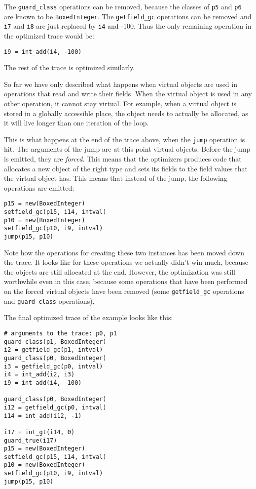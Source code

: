 \documentclass{sigplanconf}
\begin{document}
The \texttt{guard\_class} operations can be removed, because the classes of \texttt{p5} and
\texttt{p6} are known to be \texttt{BoxedInteger}. The \texttt{getfield\_gc} operations can be removed
and \texttt{i7} and \texttt{i8} are just replaced by \texttt{i4} and -100. Thus the only
remaining operation in the optimized trace would be:

\begin{verbatim}
i9 = int_add(i4, -100)
\end{verbatim}
    
The rest of the trace is optimized similarly.

So far we have only described what happens when virtual objects are used in
operations that read and write their fields. When the virtual object is used in
any other operation, it cannot stay virtual. For example, when a virtual object
is stored in a globally accessible place, the object needs to actually be
allocated, as it will live longer than one iteration of the loop.

This is what happens at the end of the trace above, when the \texttt{jump} operation
is hit. The arguments of the jump are at this point virtual objects. Before the
jump is emitted, they are \emph{forced}. This means that the optimizers produces code
that allocates a new object of the right type and sets its fields to the field
values that the virtual object has. This means that instead of the jump, the
following operations are emitted:

\begin{verbatim}
p15 = new(BoxedInteger)
setfield_gc(p15, i14, intval)
p10 = new(BoxedInteger)
setfield_gc(p10, i9, intval)
jump(p15, p10)
\end{verbatim}

Note how the operations for creating these two instances has been moved down the
trace. It looks like for these operations we actually didn't win much, because
the objects are still allocated at the end. However, the optimization was still
worthwhile even in this case, because some operations that have been performed
on the forced virtual objects have been removed (some \texttt{getfield\_gc} operations
and \texttt{guard\_class} operations).

The final optimized trace of the example looks like this:

\begin{verbatim}
# arguments to the trace: p0, p1
guard_class(p1, BoxedInteger)
i2 = getfield_gc(p1, intval)
guard_class(p0, BoxedInteger)
i3 = getfield_gc(p0, intval)
i4 = int_add(i2, i3)
i9 = int_add(i4, -100)

guard_class(p0, BoxedInteger)
i12 = getfield_gc(p0, intval)
i14 = int_add(i12, -1)

i17 = int_gt(i14, 0)
guard_true(i17)
p15 = new(BoxedInteger)
setfield_gc(p15, i14, intval)
p10 = new(BoxedInteger)
setfield_gc(p10, i9, intval)
jump(p15, p10)
\end{verbatim}
\end{document}
